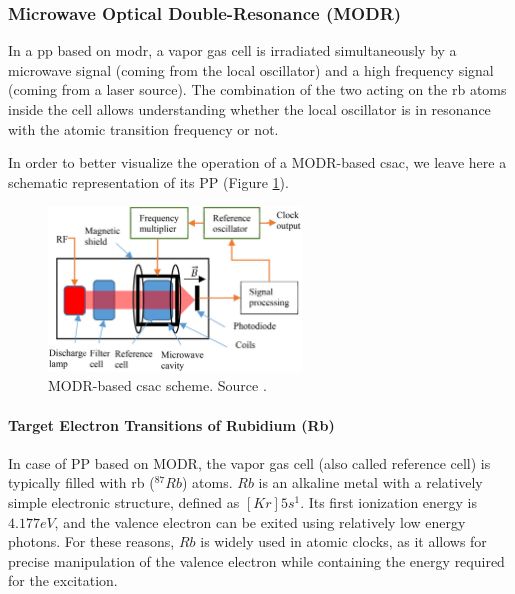 \subsubsection{Microwave Optical Double-Resonance (MODR)}
\label{sssec:MODR}

In a \acrshort{pp} based on \acrfull{modr}, a vapor gas cell is irradiated simultaneously by a microwave signal (coming from the local oscillator) and a high frequency signal (coming from a laser source).
The combination of the two acting on the \acrfull{rb} atoms inside the cell allows understanding whether the local oscillator is in resonance with the atomic transition frequency or not.

In order to better visualize the operation of a MODR-based \acrshort{csac}, we leave here a schematic representation of its PP (Figure \ref{fig:MODR-physics-package-scheme}).

\begin{figure}[H]
    \centering
    \includegraphics[width=0.6\textwidth, max width=\linewidth]{img/MODR-phisics-package-scheme.png}
    \caption{
        MODR-based \acrshort{csac} scheme.
        Source \cite{Kitching-2018}.
    }
    \label{fig:MODR-physics-package-scheme}
\end{figure}

\paragraph{Target Electron Transitions of Rubidium (Rb)}

In case of PP based on MODR, the vapor gas cell (also called reference cell) is typically filled with \acrfull{rb} ($^{87}Rb$) atoms.
$Rb$ is an alkaline metal with a relatively simple electronic structure, defined as $[Kr]5s^1$.
Its first ionization energy is $4.177 eV$, and the valence electron can be exited using relatively low energy photons.
For these reasons, $Rb$ is widely used in atomic clocks, as it allows for precise manipulation of the valence electron while containing the energy required for the excitation.

